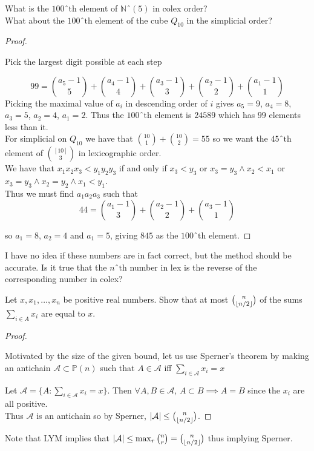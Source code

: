 \documentclass[a4paper]{article}
\renewcommand{\P}{\mathbb{P}}
\renewcommand{\A}{\mathcal{A}}
\begin{document}
\begin{question}[Question 10]
  What is the $100ˆ{\text{th}}$ element of $\mathbb{N}ˆ{(5)}$ in colex order?\\

  What about the $100ˆ{\text{th}}$ element of the cube $Q_{10}$ in the
  simplicial order?
\end{question}
\begin{proof}
  \begin{idea}
    Pick the largest digit possible at each step
  \end{idea}
  \[99 = \binom{a_5 - 1}{5} + \binom{a_4 - 1}{4} + \binom{a_3 - 1}{3} +
    \binom{a_2 - 1}{2} + \binom{a_1 - 1}{1}\]
  Picking the maximal value of $a_i$ in descending order of $i$ gives $a_5 = 9$,
  $a_4 = 8$, $a_3 = 5$, $a_2 = 4$, $a_1 = 2$. Thus the $100ˆ{\text{th}}$ element
  is $24589$ which has $99$ elements less than it.\\


  For simplicial on $Q_{10}$ we have that $\binom{10}{1} + \binom{10}{2} = 55$
  so we want the $45ˆ{\text{th}}$ element of $\binom{[10]}{3}$ in lexicographic
  order.\\
  We have that $x_1 x_2 x_3 < y_1 y_2 y_3$ if and only if $x_3 <
  y_3$ or $x_3 = y_3 \land x_2 < x_1$ or $x_3 = y_3 \land x_2 = y_2 \land x_1 <
  y_1$.\\
  Thus we must find $a_1 a_2 a_3$ such that
  \[44 = \binom{a_1 - 1}{3} + \binom{a_2 - 1}{2} + \binom{a_3 - 1}{1}\]

  so $a_1 = 8$, $a_2 = 4$ and $a_1 = 5$, giving $845$ as the $100ˆ{\text{th}}$ element.
\end{proof}
\begin{remark}
  I have no idea if these numbers are in fact correct, but the method should be
  accurate. Is it true that the $nˆ{\text{th}}$ number in lex is the reverse of
  the corresponding number in colex?
\end{remark}

\begin{question}[Question 11]
  Let $x, x_1, \dots ,x_n$ be positive real numbers. Show that at most
  $\binom{n}{\lfloor n/2\rfloor}$ of the sums $\sum_{i \in A}x_i$ are equal to $x$.
\end{question}
\begin{proof}
  \begin{idea}
    Motivated by the size of the given bound, let us use Sperner's theorem by making an antichain $\A \subset \P(n)$ such that
    $A \in \A$ iff $\sum_{i \in \A} x_i = x$
  \end{idea}
  Let $\A = \{A : \sum_{i \in \A}x_i = x\}$. Then $\forall A, B \in \A$, $A
  \subset B \implies A = B$ since the $x_i$ are all positive.\\
  Thus $\A$ is an antichain so by Sperner, $|\A| \leq \binom{n}{\floor{n/2}}$.
\end{proof}
\begin{remark}
  Note that LYM implies that $|\A| \leq \max_r{\binom{n}{r}} =
  \binom{n}{\floor{n/2}}$ thus implying Sperner.
\end{remark}
\end{document}
